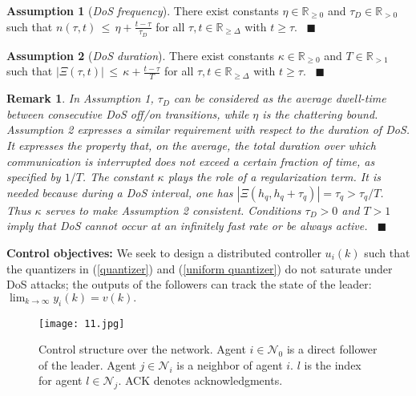 \documentclass{autart}
\def\qedp{\hspace*{\fill}~{\tiny $\blacksquare$}}
\def\qedp{\hspace*{\fill}~{\tiny $\blacksquare$}}
\newtheorem{itremark}{Remark}
\newenvironment{remark}{\begin{itremark}\rm}{\end{itremark}}
\begin{document}
\textbf{Assumption 1} \cite{de2015input}
	(\emph{DoS frequency}). 
	There exist constants 
	$\eta \in \mathbb R_{\geq 0}$ and 
	$\tau_D \in \mathbb R_{> 0}$ such that
$
	n(\tau,t)  \, \leq \,  \eta + \frac{t-\tau}{\tau_D}
$
	for all  $\tau,t \in \mathbb R_{\geq \Delta}$ with $t\geq\tau$.
	\qedp


\textbf{Assumption 2} \cite{de2015input}
	(\emph{DoS duration}). 
	There exist constants $\kappa \in \mathbb R_{\geq 0}$ and $T  \in \mathbb R_{>1}$ such that
$
	|\Xi(\tau,t)|  \, \leq \,  \kappa + \frac{t-\tau}{T}
$
	for all  $\tau,t \in \mathbb R_{\geq \Delta}$ with $t\geq\tau$. 
	\qedp


\begin{remark}
	In Assumption 1, $\tau_D$ can be considered as the average dwell-time between 
	consecutive DoS off/on transitions, while $\eta$ is the chattering bound.
	Assumption 2 expresses a similar 
	requirement with respect to the duration of DoS. 
	It expresses the property that, on the average,
	the total duration over which communication is 
	interrupted does not exceed a certain \emph{fraction} of time,
	as specified by $1/T$.
	The constant $\kappa$ plays the role
	of a regularization term. It is needed because
	during a DoS interval, one has $|\Xi(h_q,h_q+\tau_q)| = \tau_q >  \tau_q /T$.
	Thus $\kappa$ serves to make Assumption 2 consistent. 
	Conditions $\tau_D>0$ and $T>1$ imply that DoS cannot occur at an infinitely
	fast rate or be always active. \qedp
\end{remark}



\textbf{Control objectives:} We seek to design a distributed controller $u_i (k)$ such that the quantizers in (\ref{quantizer}) and (\ref{uniform quantizer}) do not saturate under DoS attacks; the outputs of the followers can track the state of the leader:
$
\lim_{k  \to \infty }   y_i(k)  = v(k).
$




\begin{figure}[t]
	\begin{center}
		\texttt{[image: 11.jpg]} \\
		\vspace{-2mm}
		\linespread{1}\caption{Control structure over the network. Agent $i \in \mathcal N_0$ is a direct follower of the leader. Agent $j\in \mathcal N_i$ is a neighbor of agent $i$. $l$ is the index for agent $l\in \mathcal N_j$. ACK denotes acknowledgments. }\label{fig}
	\end{center}
\end{figure}
\end{document}
